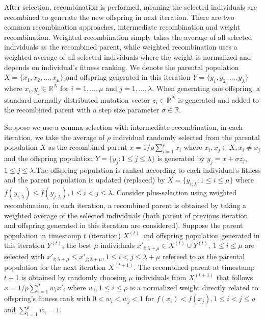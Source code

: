After selection, recombination is performed, meaning the selected individuals are recombined to generate the new offspring in next iteration. There are two common recombination approaches, intermediate recombination and weight recombination. Weighted recombination simply takes the average of all selected individuals as the recombined parent, while weighted recombination uses a weighted average of all selected individuals where the weight is normalized and depends on individual's fitness ranking. We denote the parental population $X = \{x_1,x_2,...,x_\mu\}$ and offspring generated in this iteration $Y = \{y_1,y_2,...,y_{\lambda} \}$ where $x_i,y_j \in \mathbb{R}^N$ for $i=1,...,\mu$ and $j=1,...,\lambda$. When generating one offspring, a standard normally distributed mutation vector $z_i \in \mathbb{R}^N $ is generated and added to the recombined parent with a step size parameter $\sigma \in \mathbb{R}$.  

Suppose we use a comma-selection with intermediate recombination, in each iteration, we take the average of $\rho$ individual randomly selected from the parental population $X$ as the recombined parent $x = 1/\rho \sum_{i=1}^{\rho}x_i$ where $x_i,x_j \in X, x_i \neq x_j$ and the offspring population $Y = \{y_j: 1 \leq j \leq \lambda\}$ is generated by  $y_j = x + \sigma z_j$, $1 \leq j \leq \lambda$.The offspring population is ranked according to each individual's fitness and the parent population is updated (replaced) by $X = \{ y_{i;\lambda}:1 \leq i \leq \mu \}$ where $f(y_{i;\lambda}) \leq f(y_{j,\lambda}), 1 \leq i < j \leq \lambda$. Consider plus-selection using weighted recombination, in each iteration, a recombined parent is obtained by taking a weighted average of the selected individuals (both parent of previous iteration and offspring generated in this iteration are considered). Suppose the parent population in timestamp $t$ (iteration) $X^{(t)}$ and offspring population generated in this iteration $Y^{(t)}$, the best $\mu$ individuals $x \prime_{i;\lambda+\mu} \in X^{(t)} \cup Y^{(t)},\  1 \leq i \leq \mu$ are selected with $ x \prime_{i;\lambda+\mu} \leq x \prime_{j;\lambda+\mu}, 1 \leq i < j \leq \lambda+\mu $ refereed to as the parental population for the next iteration $X^{(t+1)}$. The recombined parent at timestamp $t+1$ is obtained by randomly choosing $\mu$ individuals from $X^{(t+1)}$ that follows $x = 1/\rho \sum_{i=1}^{\rho} w_i x \prime _i$ where $w_i, 1 \leq i \leq \rho$ is a normalized weight directly related to offspring's fitness rank with $0 < w_i < w_j < 1$ for $f(x_i) < f(x_j),1 \leq i < j  \leq \rho$ and $\sum_{i=1}^\rho w_i = 1$.

